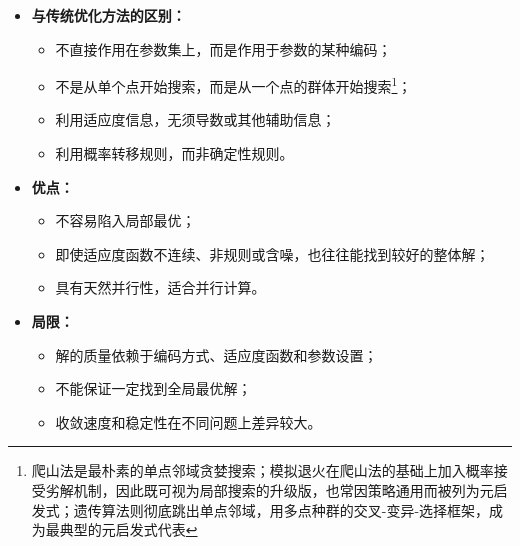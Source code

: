 \documentclass[../main.tex]{subfiles}
\begin{document}
\begin{enumerate}
\begin{itemize}
    \item \textbf{与传统优化方法的区别：}
    \begin{itemize}
        \item 不直接作用在参数集上，而是作用于参数的某种编码；
        \item 不是从单个点开始搜索，而是从一个点的群体开始搜索\footnote{爬山法是最朴素的单点邻域贪婪搜索；模拟退火在爬山法的基础上加入概率接受劣解机制，因此既可视为局部搜索的升级版，也常因策略通用而被列为元启发式；遗传算法则彻底跳出单点邻域，用多点种群的交叉-变异-选择框架，成为最典型的元启发式代表}；
        \item 利用适应度信息，无须导数或其他辅助信息；
        \item 利用概率转移规则，而非确定性规则。
    \end{itemize}

    \item \textbf{优点：}
    \begin{itemize}
        \item 不容易陷入局部最优；
        \item 即使适应度函数不连续、非规则或含噪，也往往能找到较好的整体解；
        \item 具有天然并行性，适合并行计算。
    \end{itemize}

    \item \textbf{局限：}
    \begin{itemize}
        \item 解的质量依赖于编码方式、适应度函数和参数设置；
        \item 不能保证一定找到全局最优解；
        \item 收敛速度和稳定性在不同问题上差异较大。
    \end{itemize}

    \end{itemize}
\end{enumerate}
\end{document}
